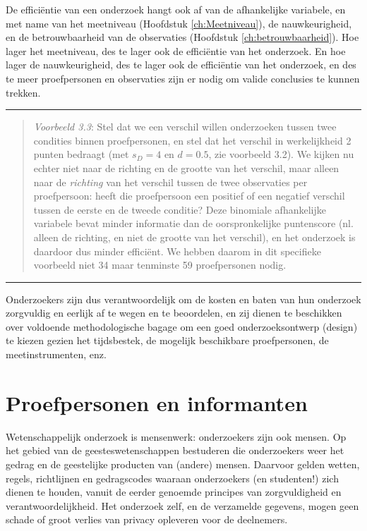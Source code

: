 \documentclass[
]{book}
\begin{document}
De efficiëntie van een onderzoek hangt ook af van de afhankelijke
variabele, en met name van het meetniveau
(Hoofdstuk \ref{ch:Meetniveau}), de nauwkeurigheid, en de betrouwbaarheid
van de observaties
(Hoofdstuk \ref{ch:betrouwbaarheid}). Hoe lager het meetniveau, des te lager
ook de efficiëntie van het onderzoek. En hoe lager de nauwkeurigheid,
des te lager ook de efficiëntie van het onderzoek, en des te meer
proefpersonen en observaties zijn er nodig om valide conclusies te
kunnen trekken.

\begin{center}\rule{0.5\linewidth}{0.5pt}\end{center}

\begin{quote}
\emph{Voorbeeld 3.3}:
Stel dat we een verschil willen onderzoeken tussen twee condities binnen
proefpersonen, en stel dat het verschil in werkelijkheid 2 punten
bedraagt (met \(s_D=4\) en \(d=0.5\), zie
voorbeeld 3.2). We kijken nu echter niet naar de richting en
de grootte van het verschil, maar alleen naar de \emph{richting} van het
verschil tussen de twee observaties per proefpersoon: heeft die
proefpersoon een positief of een negatief verschil tussen de eerste en
de tweede conditie? Deze binomiale afhankelijke variabele bevat minder
informatie dan de oorspronkelijke puntenscore (nl. alleen de richting,
en niet de grootte van het verschil), en het onderzoek is daardoor dus
minder efficiënt. We hebben daarom in dit specifieke voorbeeld niet 34
maar tenminste 59 proefpersonen nodig.
\end{quote}

\begin{center}\rule{0.5\linewidth}{0.5pt}\end{center}

Onderzoekers zijn dus verantwoordelijk om de kosten en baten van hun
onderzoek zorgvuldig en eerlijk af te wegen en te beoordelen, en zij
dienen te beschikken over voldoende methodologische bagage om een goed
onderzoeksontwerp (design) te kiezen gezien het tijdsbestek, de mogelijk
beschikbare proefpersonen, de meetinstrumenten, enz.

\hypertarget{proefpersonen-en-informanten}{%
\section{Proefpersonen en informanten}\label{proefpersonen-en-informanten}}

Wetenschappelijk onderzoek is mensenwerk: onderzoekers zijn ook mensen.
Op het gebied van de geesteswetenschappen bestuderen die onderzoekers
weer het gedrag en de geestelijke producten van (andere) mensen.
Daarvoor gelden wetten, regels, richtlijnen en gedragscodes waaraan
onderzoekers (en studenten!) zich dienen te houden, vanuit de eerder
genoemde principes van zorgvuldigheid en verantwoordelijkheid. Het
onderzoek zelf, en de verzamelde gegevens, mogen geen schade of groot
verlies van privacy opleveren voor de deelnemers.
\end{document}
